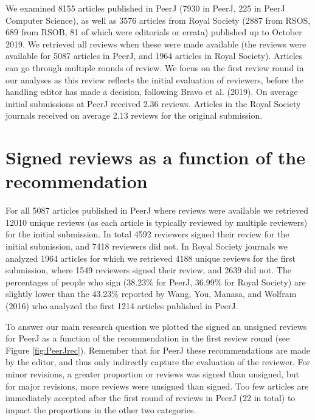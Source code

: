\documentclass[,jou, a4paper,floatsintext]{apa6}
\begin{document}
We examined 8155 articles published in PeerJ (7930 in PeerJ, 225 in PeerJ Computer Science), as well as 3576 articles from Royal Society (2887 from RSOS, 689 from RSOB, 81 of which were editorials or errata) published up to October 2019. We retrieved all reviews when these were made available (the reviews were available for 5087 articles in PeerJ, and 1964 articles in Royal Society). Articles can go through multiple rounds of review. We focus on the first review round in our analyses as this review reflects the initial evaluation of reviewers, before the handling editor has made a decision, following Bravo et al. (2019). On average initial submissions at PeerJ received 2.36 reviews. Articles in the Royal Society journals received on average 2.13 reviews for the original submission.

\hypertarget{signed-reviews-as-a-function-of-the-recommendation}{%
\section{Signed reviews as a function of the recommendation}\label{signed-reviews-as-a-function-of-the-recommendation}}

For all 5087 articles published in PeerJ where reviews were available we retrieved 12010 unique reviews (as each article is typically reviewed by multiple reviewers) for the initial submission. In total 4592 reviewers signed their review for the initial submission, and 7418 reviewers did not. In Royal Society journals we analyzed 1964 articles for which we retrieved 4188 unique reviews for the first submission, where 1549 reviewers signed their review, and 2639 did not. The percentages of people who sign (38.23\% for PeerJ, 36.99\% for Royal Society) are slightly lower than the 43.23\% reported by Wang, You, Manasa, and Wolfram (2016) who analyzed the first 1214 articles published in PeerJ.

To answer our main research question we plotted the signed an unsigned reviews for PeerJ as a function of the recommendation in the first review round (see Figure \ref{fig:PeerJrec}). Remember that for PeerJ these recommendations are made by the editor, and thus only indirectly capture the evaluation of the reviewer. For minor revisions, a greater proportion or reviews was signed than unsigned, but for major revisions, more reviews were unsigned than signed. Too few articles are immediately accepted after the first round of reviews in PeerJ (22 in total) to impact the proportions in the other two categories.
\end{document}
